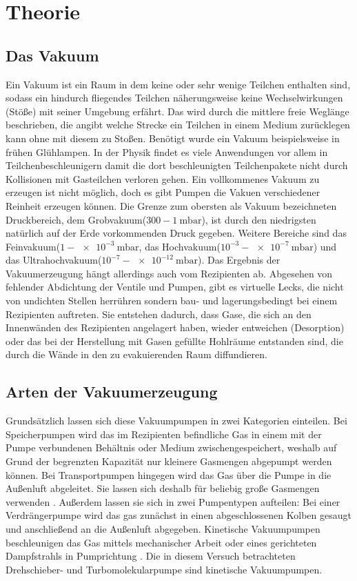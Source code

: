 
\section{Theorie}
\label{sec:Theorie}

\subsection{Das Vakuum}

Ein Vakuum ist ein Raum in dem keine oder sehr wenige Teilchen enthalten sind, sodass ein hindurch fliegendes Teilchen näherungsweise keine Wechselwirkungen (Stöße) mit seiner Umgebung erfährt. Das wird durch die mittlere freie Weglänge beschrieben, die angibt welche Strecke ein Teilchen in einem Medium zurücklegen kann ohne mit diesem zu Stoßen. Benötigt wurde ein Vakuum beispielsweise in frühen Glühlampen. In der Physik findet es viele Anwendungen vor allem in Teilchenbeschleunigern damit die dort beschleunigten Teilchenpakete nicht durch Kollisionen mit Gasteilchen verloren gehen.
Ein vollkommenes Vakuum zu erzeugen ist nicht möglich, doch es gibt Pumpen die Vakuen verschiedener Reinheit erzeugen können. Die Grenze zum obersten als Vakuum bezeichneten Druckbereich, dem Grobvakuum($300 - \SI{1}{\milli\bar}$), ist durch den niedrigsten natürlich auf der Erde vorkommenden Druck gegeben. Weitere Bereiche sind das Feinvakuum($1 - \SI{e-3}{\milli\bar}$, das Hochvakuum($10^{-3} - \SI{e-7}{\milli\bar}$) und das Ultrahochvakuum($10^{-7} - \SI{e-12}{\milli\bar}$). Das Ergebnis der Vakuumerzeugung hängt allerdings auch vom Rezipienten ab. Abgesehen von fehlender Abdichtung der Ventile und Pumpen, gibt es virtuelle Lecks, die nicht von undichten Stellen herrühren sondern bau- und lagerungsbedingt bei einem Rezipienten auftreten. Sie entstehen dadurch, dass Gase, die sich an den Innenwänden des Rezipienten angelagert haben, wieder entweichen (Desorption) oder das bei der Herstellung mit Gasen gefüllte Hohlräume entstanden sind, die durch die Wände in den zu evakuierenden Raum diffundieren.

\subsection{Arten der Vakuumerzeugung}

Grundsätzlich lassen sich diese Vakuumpumpen in zwei Kategorien einteilen.
Bei Speicherpumpen wird das im Rezipienten befindliche Gas in einem mit der Pumpe verbundenen Behältnis oder Medium zwischengespeichert, weshalb auf Grund der begrenzten Kapazität nur kleinere Gasmengen abgepumpt werden können.
Bei Transportpumpen hingegen wird das Gas über die Pumpe in die Außenluft abgeleitet. Sie lassen sich deshalb für beliebig große Gasmengen verwenden \cite{Jena}. 
Außerdem lassen sie sich in zwei Pumpentypen aufteilen:\newline
Bei einer Verdrängerpumpe wird das gas zunächst in einen abgeschlossenen Kolben gesaugt und anschließend an die Außenluft abgegeben.\newline
Kinetische Vakuumpumpen beschleunigen das Gas mittels mechanischer Arbeit oder eines gerichteten Dampfstrahls in Pumprichtung \cite{Pfeiffer}.
Die in diesem Versuch betrachteten Drehschieber- und Turbomolekularpumpe sind kinetische Vakuumpumpen.

